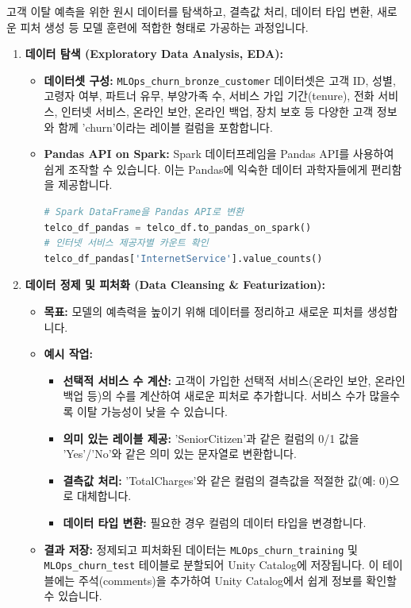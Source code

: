 \documentclass[11pt,a4paper]{article}
\theoremstyle{definition}
\begin{document}
\begin{summarybox}
고객 이탈 예측을 위한 원시 데이터를 탐색하고, 결측값 처리, 데이터 타입 변환, 새로운 피처 생성 등 모델 훈련에 적합한 형태로 가공하는 과정입니다.
\end{summarybox}

\begin{enumerate}
    \item \textbf{데이터 탐색 (Exploratory Data Analysis, EDA):}
    \begin{itemize}
        \item \textbf{데이터셋 구성:} \texttt{MLOps_churn_bronze_customer} 데이터셋은 고객 ID, 성별, 고령자 여부, 파트너 유무, 부양가족 수, 서비스 가입 기간(tenure), 전화 서비스, 인터넷 서비스, 온라인 보안, 온라인 백업, 장치 보호 등 다양한 고객 정보와 함께 'churn'이라는 레이블 컬럼을 포함합니다.
        \item \textbf{Pandas API on Spark:} Spark 데이터프레임을 Pandas API를 사용하여 쉽게 조작할 수 있습니다. 이는 Pandas에 익숙한 데이터 과학자들에게 편리함을 제공합니다.
        \begin{lstlisting}[language=Python, caption={Pandas API on Spark 예시}, label={lst:pandas_api_spark}]
# Spark DataFrame을 Pandas API로 변환
telco_df_pandas = telco_df.to_pandas_on_spark()
# 인터넷 서비스 제공자별 카운트 확인
telco_df_pandas['InternetService'].value_counts()
\end{lstlisting}
    \end{itemize}

    \item \textbf{데이터 정제 및 피처화 (Data Cleansing \& Featurization):}
    \begin{itemize}
        \item \textbf{목표:} 모델의 예측력을 높이기 위해 데이터를 정리하고 새로운 피처를 생성합니다.
        \item \textbf{예시 작업:}
        \begin{itemize}
            \item \textbf{선택적 서비스 수 계산:} 고객이 가입한 선택적 서비스(온라인 보안, 온라인 백업 등)의 수를 계산하여 새로운 피처로 추가합니다. 서비스 수가 많을수록 이탈 가능성이 낮을 수 있습니다.
            \item \textbf{의미 있는 레이블 제공:} 'SeniorCitizen'과 같은 컬럼의 0/1 값을 'Yes'/'No'와 같은 의미 있는 문자열로 변환합니다.
            \item \textbf{결측값 처리:} 'TotalCharges'와 같은 컬럼의 결측값을 적절한 값(예: 0)으로 대체합니다.
            \item \textbf{데이터 타입 변환:} 필요한 경우 컬럼의 데이터 타입을 변경합니다.
        \end{itemize}
        \item \textbf{결과 저장:} 정제되고 피처화된 데이터는 \texttt{MLOps_churn_training} 및 \texttt{MLOps_churn_test} 테이블로 분할되어 Unity Catalog에 저장됩니다. 이 테이블에는 주석(comments)을 추가하여 Unity Catalog에서 쉽게 정보를 확인할 수 있습니다.
    \end{itemize}
\end{enumerate}
\end{document}
